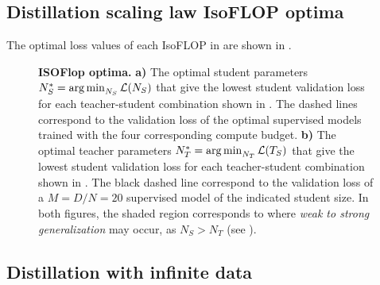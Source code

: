 \FloatBarrier


\subsection{Distillation scaling law IsoFLOP optima}
\label{ssec:distillation-scaling-law-isoflop-optima}
The optimal loss values of each IsoFLOP in  are shown in .

\begin{figure}[h]
	\centering
	\caption{\textbf{ISOFlop optima.}
		\textbf{a)} The optimal student parameters $N_S^*=\operatorname*{arg\,min}_{N_S} \mathcal{L}(N_S)$ that give the lowest student validation loss for each teacher-student combination shown in . The dashed lines correspond to the validation loss of the optimal supervised models trained with the four corresponding compute budget.
		\textbf{b)} The optimal teacher parameters $N_T^*=\operatorname*{arg\,min}_{N_T} \mathcal{L}(T_S)$ that give the lowest student validation loss for each teacher-student combination shown in . The black dashed line correspond to the validation loss of a $M=D/N=20$ supervised model of the indicated student size.
		In both figures, the shaded region corresponds to where \emph{weak to strong generalization} may occur, as $N_S>N_T$ (see ).}
	\label{fig:isoflop-optima}
\end{figure}

\FloatBarrier

\subsection{Distillation with infinite data}
\label{ssec:distillation-with-infinite-data}

